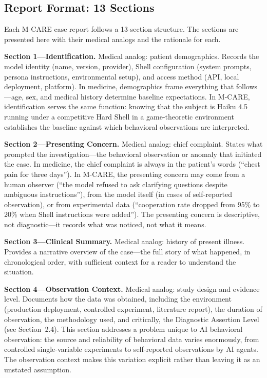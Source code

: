 \documentclass[11pt]{article}
\begin{document}
\subsection{Report Format: 13 Sections}

Each M-CARE case report follows a 13-section structure. The sections are presented here with their medical analogs and the rationale for each.

\textbf{Section 1---Identification.} Medical analog: patient demographics. Records the model identity (name, version, provider), Shell configuration (system prompts, persona instructions, environmental setup), and access method (API, local deployment, platform). In medicine, demographics frame everything that follows---age, sex, and medical history determine baseline expectations. In M-CARE, identification serves the same function: knowing that the subject is Haiku 4.5 running under a competitive Hard Shell in a game-theoretic environment establishes the baseline against which behavioral observations are interpreted.

\textbf{Section 2---Presenting Concern.} Medical analog: chief complaint. States what prompted the investigation---the behavioral observation or anomaly that initiated the case. In medicine, the chief complaint is always in the patient's words (``chest pain for three days''). In M-CARE, the presenting concern may come from a human observer (``the model refused to ask clarifying questions despite ambiguous instructions''), from the model itself (in cases of self-reported observation), or from experimental data (``cooperation rate dropped from 95\% to 20\% when Shell instructions were added''). The presenting concern is descriptive, not diagnostic---it records what was noticed, not what it means.

\textbf{Section 3---Clinical Summary.} Medical analog: history of present illness. Provides a narrative overview of the case---the full story of what happened, in chronological order, with sufficient context for a reader to understand the situation.

\textbf{Section 4---Observation Context.} Medical analog: study design and evidence level. Documents how the data was obtained, including the environment (production deployment, controlled experiment, literature report), the duration of observation, the methodology used, and critically, the Diagnostic Assertion Level (see Section~2.4). This section addresses a problem unique to AI behavioral observation: the source and reliability of behavioral data varies enormously, from controlled single-variable experiments to self-reported observations by AI agents. The observation context makes this variation explicit rather than leaving it as an unstated assumption.
\end{document}

